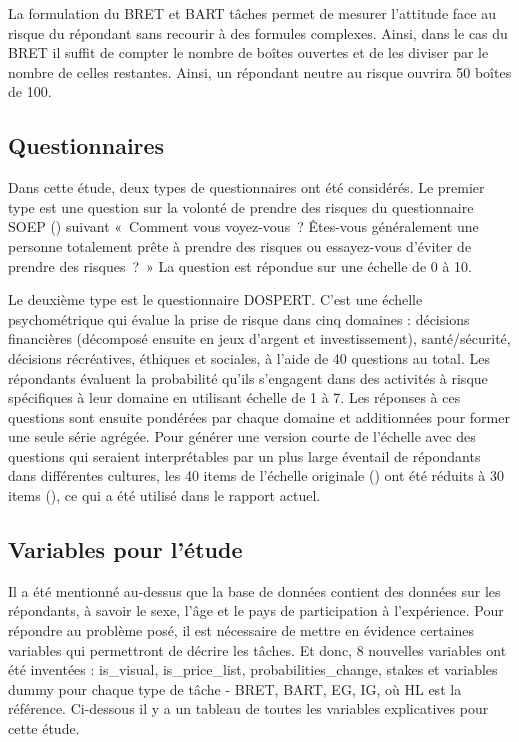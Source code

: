 \documentclass[12pt]{article}
\begin{document}
La formulation du BRET et BART tâches permet de mesurer l'attitude face
au risque du répondant sans recourir à des formules complexes. Ainsi,
dans le cas du BRET il suffit de compter le nombre de boîtes ouvertes et
de les diviser par le nombre de celles restantes. Ainsi, un répondant
neutre au risque ouvrira 50 boîtes de 100.

\subsection{Questionnaires}

Dans cette étude, deux types de questionnaires ont été considérés. Le
premier type est une question sur la volonté de prendre des risques du
questionnaire SOEP (\citet{SOEP2007}) suivant «~Comment vous
voyez-vous~? Êtes-vous généralement une personne totalement prête à
prendre des risques ou essayez-vous d'éviter de prendre des risques~?~»
La question est répondue sur une échelle de 0 à 10.

Le deuxième type est le questionnaire DOSPERT. C'est une échelle
psychométrique qui évalue la prise de risque dans cinq domaines :
décisions financières (décomposé ensuite en jeux d'argent et
investissement), santé/sécurité, décisions récréatives, éthiques et
sociales, à l'aide de 40 questions au total. Les répondants évaluent la
probabilité qu'ils s'engagent dans des activités à risque spécifiques à
leur domaine en utilisant échelle de 1 à 7. Les réponses à ces questions
sont ensuite pondérées par chaque domaine et additionnées pour former
une seule série agrégée. Pour générer une version courte de l'échelle
avec des questions qui seraient interprétables par un plus large
éventail de répondants dans différentes cultures, les 40 items de
l'échelle originale (\citet{Weber2002}) ont été réduits à 30 items
(\citet{Blais2006}), ce qui a été utilisé dans le rapport actuel.

\subsection{Variables pour l'étude}

Il a été mentionné au-dessus que la base de données contient des données
sur les répondants, à savoir le sexe, l'âge et le pays de participation
à l'expérience. Pour répondre au problème posé, il est nécessaire de
mettre en évidence certaines variables qui permettront de décrire les
tâches. Et donc, 8 nouvelles variables ont été inventées : is\_visual,
is\_price\_list, probabilities\_change, stakes et variables dummy pour
chaque type de tâche - BRET, BART, EG, IG, où HL est la référence.
Ci-dessous il y a un tableau de toutes les variables explicatives pour
cette étude.
\end{document}
